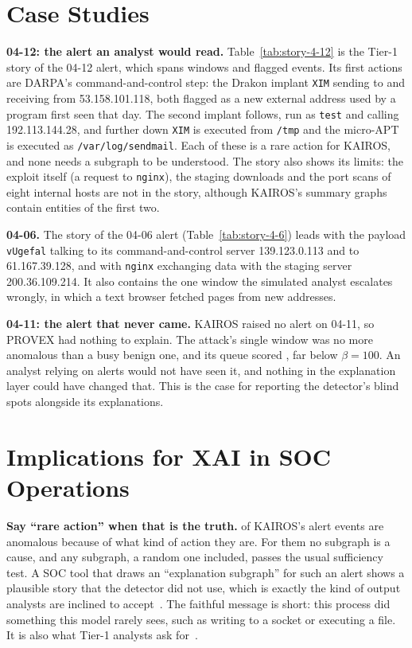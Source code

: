 \documentclass[conference]{IEEEtran}
\begin{document}
\section{Case Studies}
\label{sec:cases}

\textbf{04-12: the alert an analyst would read.} Table~\ref{tab:story-4-12} is the Tier-1 story of the
04-12 alert, which spans \AlertWindowsTwelve{} windows and \FlaggedEventsTwelve{} flagged events. Its first
actions are DARPA's command-and-control step: the Drakon implant \texttt{XIM} sending to and receiving from
53.158.101.118, both flagged as a new external address used by a program first seen that day. The second
implant follows, run as \texttt{test} and calling 192.113.144.28, and further down \texttt{XIM} is executed
from \texttt{/tmp} and the micro-APT is executed as \texttt{/var/log/sendmail}. Each of these is a rare
action for KAIROS, and none needs a subgraph to be understood. The story also shows its limits: the
exploit itself (a request to \texttt{nginx}), the staging downloads and the port scans of eight internal
hosts are not in the story, although KAIROS's summary graphs contain entities of the first two.

\textbf{04-06.} The story of the 04-06 alert (Table~\ref{tab:story-4-6}) leads with the payload
\texttt{vUgefal} talking to its command-and-control server 139.123.0.113 and to 61.167.39.128, and with
\texttt{nginx} exchanging data with the staging server 200.36.109.214. It also contains the one window the
simulated analyst escalates wrongly, in which a text browser fetched pages from new addresses.

\textbf{04-11: the alert that never came.} KAIROS raised no alert on 04-11, so PROVEX had nothing to
explain. The attack's single window was no more anomalous than a busy benign one, and its queue scored
\BetaNeededEleven{}, far below $\beta{=}100$. An analyst relying on alerts would not have seen it, and
nothing in the explanation layer could have changed that. This is the case for reporting the detector's
blind spots alongside its explanations.
\section{Implications for XAI in SOC Operations}
\label{sec:implications}
\textbf{Say ``rare action'' when that is the truth.} \FracPriorEvents{} of KAIROS's alert events are
anomalous because of what kind of action they are. For them no subgraph is a cause, and any subgraph,
a random one included, passes the usual sufficiency test. A SOC tool that draws an ``explanation
subgraph'' for such an alert shows a plausible story that the detector did not use, which is exactly
the kind of output analysts are inclined to accept~\cite{tmt}. The faithful message is short: this
process did something this model rarely sees, such as writing to a socket or executing a file. It is
also what Tier-1 analysts ask for~\cite{tmt}.
\end{document}
